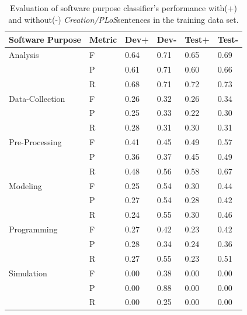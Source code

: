 \begin{table}[ht]
	\centering
	\caption{Evaluation of software purpose classifier's performance with(+) and without(-) \emph{Creation/PLoS}sentences in the training data set.}
	\begin{tabular*}{0.75\textwidth}{@{\extracolsep{\fill}}  l  l l  l l l } %
		\hline
		Software Purpose & Metric & Dev+        & Dev-     & Test+  &Test- \\
		\hline 
		Analysis         & F     & 0.64        & 0.71     &0.65     &0.69   \\
		                 & P     & 0.61        & 0.71     &0.60     &0.66   \\
		                 & R     & 0.68        & 0.71     &0.72     &0.73   \\
		\hline
		Data-Collection  & F     & 0.26        &  0.32    & 0.26    & 0.34  \\
					     & P     & 0.25        &  0.33    & 0.22    & 0.30  \\
						 & R     & 0.28        &  0.31    & 0.30    & 0.31  \\		
		
		\hline
		Pre-Processing   & F     & 0.41        &  0.45    & 0.49    & 0.57  \\
						 & P     & 0.36        &  0.37    & 0.45    & 0.49  \\
						 & R     & 0.48        &  0.56    & 0.58    & 0.67  \\
		\hline
		Modeling         & F     & 0.25        &  0.54    & 0.30    & 0.44  \\
					     & P     & 0.27        &  0.54    & 0.28    & 0.42  \\
						 & R     & 0.24        &  0.55    & 0.30    & 0.46  \\
	
		\hline
		Programming      & F     & 0.27        &  0.42    & 0.23    & 0.42  \\
						 & P     & 0.28        &  0.34    & 0.24    & 0.36  \\
						 & R     & 0.27        &  0.55    & 0.23    & 0.51  \\
		
		\hline
		Simulation      & F     & 0.00        &  0.38    & 0.00    & 0.00 \\
						& P     & 0.00        &  0.88    & 0.00    & 0.00  \\
						& R     & 0.00        &  0.25    & 0.00    & 0.00  \\
		

\end{tabular*}
\end{table}
